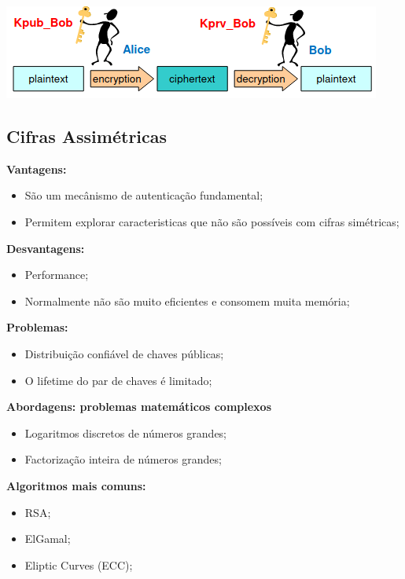 \documentclass{article}
\begin{document}
\begin{center}
  \includegraphics[scale=0.6]{2}
\end{center}

\subsection{Cifras Assimétricas}

\begin{flushleft}
  \textbf{Vantagens:}
  \begin{itemize}
    \item São um mecânismo de autenticação fundamental;
    \item Permitem explorar caracteristicas que não são possíveis com cifras simétricas;
  \end{itemize}

  \vspace{2mm}

  \textbf{Desvantagens:}
  \begin{itemize}
    \item Performance;
    \item Normalmente não são muito eficientes e consomem muita memória;
  \end{itemize}

  \vspace{2mm}
  \textbf{Problemas:}
  \begin{itemize}
    \item Distribuição confiável de chaves públicas;
    \item O lifetime do par de chaves é limitado;
  \end{itemize}

  \vspace{2mm}

  \textbf{Abordagens: problemas matemáticos complexos}
  \begin{itemize}
    \item Logaritmos discretos de números grandes;
    \item Factorização inteira de números grandes;
  \end{itemize}

  \vspace{2mm}
  \textbf{Algoritmos mais comuns:}
  \begin{itemize}
    \item RSA;
    \item ElGamal;
    \item Eliptic Curves (ECC);
  \end{itemize}


\end{flushleft}
\end{document}
